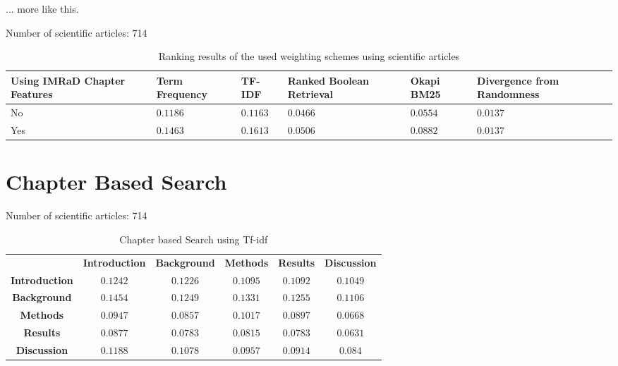... more like this.

Number of scientific articles: 714

\begin{table}[b]
    \centering
    \begin{tabular}{ C{2.1cm} C{2.1cm} C{2.1cm} C{2.1cm} C{2.1cm} C{2.1cm} }
      \toprule
      \textbf{Using IMRaD Chapter Features} & \textbf{Term Frequency} & \textbf{TF-IDF} & \textbf{Ranked Boolean Retrieval} & \textbf{Okapi BM25} & \textbf{Divergence from Randomness} \\ \midrule
      No  & $0.1186$ & $0.1163$ & $0.0466$ & $0.0554$ & $0.0137$ \\
      Yes & $0.1463$ & $0.1613$ & $0.0506$ & $0.0882$ & $0.0137$ \\
      \bottomrule
    \end{tabular}
  \caption[Ranking results using scientific articles]{Ranking results of the used weighting schemes using scientific articles}
  \label{tbl:ranking_result_full}
\end{table}


\section{Chapter Based Search}

Number of scientific articles: 714

\begin{table}[b]
  \centering
  \begin{tabular}{ c c c c c c }
    \toprule
     & \textbf{Introduction} & \textbf{Background} & \textbf{Methods} & \textbf{Results} & \textbf{Discussion} \\
    \textbf{Introduction} & $0.1242$ & $0.1226$ & $0.1095$ & $0.1092$ & $0.1049$ \\
    \textbf{Background}   & $0.1454$ & $0.1249$ & $0.1331$ & $0.1255$ & $0.1106$ \\
    \textbf{Methods}      & $0.0947$ & $0.0857$ & $0.1017$ & $0.0897$ & $0.0668$ \\
    \textbf{Results}      & $0.0877$ & $0.0783$ & $0.0815$ & $0.0783$ & $0.0631$ \\
    \textbf{Discussion}   & $0.1188$ & $0.1078$ & $0.0957$ & $0.0914$ & $0.084$  \\
    \bottomrule
  \end{tabular}
  \caption[Chapter based Search using Tf-idf]{Chapter based Search using Tf-idf}
  \label{tbl:ranking_result_full}
\end{table}

